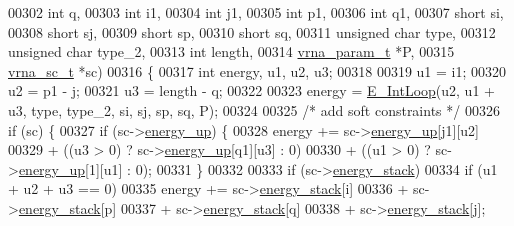 \begin{DoxyCode}
00302                       \textcolor{keywordtype}{int}           q,
00303                       \textcolor{keywordtype}{int}           i1,
00304                       \textcolor{keywordtype}{int}           j1,
00305                       \textcolor{keywordtype}{int}           p1,
00306                       \textcolor{keywordtype}{int}           q1,
00307                       \textcolor{keywordtype}{short}         si,
00308                       \textcolor{keywordtype}{short}         sj,
00309                       \textcolor{keywordtype}{short}         sp,
00310                       \textcolor{keywordtype}{short}         sq,
00311                       \textcolor{keywordtype}{unsigned} \textcolor{keywordtype}{char} type,
00312                       \textcolor{keywordtype}{unsigned} \textcolor{keywordtype}{char} type\_2,
00313                       \textcolor{keywordtype}{int}           length,
00314                       \hyperlink{group__energy__parameters_structvrna__param__s}{vrna\_param\_t}  *P,
00315                       \hyperlink{group__soft__constraints_structvrna__sc__s}{vrna\_sc\_t}     *sc)
00316 \{
00317   \textcolor{keywordtype}{int} energy, u1, u2, u3;
00318 
00319   u1  = i1;
00320   u2  = p1 - j;
00321   u3  = length - q;
00322 
00323   energy = \hyperlink{group__loops_gaafbc187b7f78e8e82afb77dd6f3b8fc5}{E\_IntLoop}(u2, u1 + u3, type, type\_2, si, sj, sp, sq, P);
00324 
00325   \textcolor{comment}{/* add soft constraints */}
00326   \textcolor{keywordflow}{if} (sc) \{
00327     \textcolor{keywordflow}{if} (sc->\hyperlink{group__soft__constraints_a57e4dbb924ab11f304e3762a3a9b07a1}{energy\_up}) \{
00328       energy += sc->\hyperlink{group__soft__constraints_a57e4dbb924ab11f304e3762a3a9b07a1}{energy\_up}[j1][u2]
00329                 + ((u3 > 0) ? sc->\hyperlink{group__soft__constraints_a57e4dbb924ab11f304e3762a3a9b07a1}{energy\_up}[q1][u3] : 0)
00330                 + ((u1 > 0) ? sc->\hyperlink{group__soft__constraints_a57e4dbb924ab11f304e3762a3a9b07a1}{energy\_up}[1][u1] : 0);
00331     \}
00332 
00333     \textcolor{keywordflow}{if} (sc->\hyperlink{group__soft__constraints_ac20dded6068e81acd0f1139092f66a22}{energy\_stack})
00334       \textcolor{keywordflow}{if} (u1 + u2 + u3 == 0)
00335         energy += sc->\hyperlink{group__soft__constraints_ac20dded6068e81acd0f1139092f66a22}{energy\_stack}[i]
00336                   + sc->\hyperlink{group__soft__constraints_ac20dded6068e81acd0f1139092f66a22}{energy\_stack}[p]
00337                   + sc->\hyperlink{group__soft__constraints_ac20dded6068e81acd0f1139092f66a22}{energy\_stack}[q]
00338                   + sc->\hyperlink{group__soft__constraints_ac20dded6068e81acd0f1139092f66a22}{energy\_stack}[j];

\end{DoxyCode}
